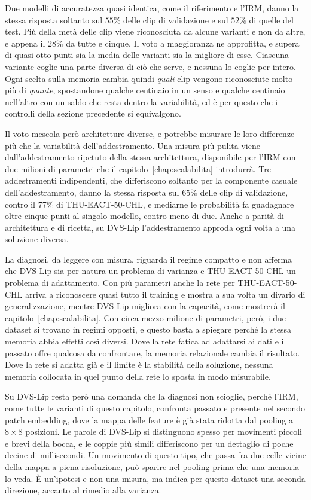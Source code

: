 Due modelli di accuratezza quasi identica, come il riferimento e l'IRM, danno la stessa risposta soltanto sul $55\%$ delle clip di validazione e sul $52\%$ di quelle del test. Più della metà delle clip viene riconosciuta da alcune varianti e non da altre, e appena il $28\%$ da tutte e cinque. Il voto a maggioranza ne approfitta, e supera di quasi otto punti sia la media delle varianti sia la migliore di esse. Ciascuna variante coglie una parte diversa di ciò che serve, e nessuna lo coglie per intero. Ogni scelta sulla memoria cambia quindi \emph{quali} clip vengono riconosciute molto più di \emph{quante}, spostandone qualche centinaio in un senso e qualche centinaio nell'altro con un saldo che resta dentro la variabilità, ed è per questo che i controlli della sezione precedente si equivalgono.

Il voto mescola però architetture diverse, e potrebbe misurare le loro differenze più che la variabilità dell'addestramento. Una misura più pulita viene dall'addestramento ripetuto della stessa architettura, disponibile per l'IRM con due milioni di parametri che il capitolo~\ref{chap:scalabilita} introdurrà. Tre addestramenti indipendenti, che differiscono soltanto per la componente casuale dell'addestramento, danno la stessa risposta sul $65\%$ delle clip di validazione, contro il $77\%$ di THU-EACT-50-CHL, e mediarne le probabilità fa guadagnare oltre cinque punti al singolo modello, contro meno di due. Anche a parità di architettura e di ricetta, su DVS-Lip l'addestramento approda ogni volta a una soluzione diversa.

La diagnosi, da leggere con misura, riguarda il regime compatto e non afferma che DVS-Lip sia per natura un problema di varianza e THU-EACT-50-CHL un problema di adattamento. Con più parametri anche la rete per THU-EACT-50-CHL arriva a riconoscere quasi tutto il training e mostra a sua volta un divario di generalizzazione, mentre DVS-Lip migliora con la capacità, come mostrerà il capitolo~\ref{chap:scalabilita}. Con circa mezzo milione di parametri, però, i due dataset si trovano in regimi opposti, e questo basta a spiegare perché la stessa memoria abbia effetti così diversi. Dove la rete fatica ad adattarsi ai dati e il passato offre qualcosa da confrontare, la memoria relazionale cambia il risultato. Dove la rete si adatta già e il limite è la stabilità della soluzione, nessuna memoria collocata in quel punto della rete lo sposta in modo misurabile.

Su DVS-Lip resta però una domanda che la diagnosi non scioglie, perché l'IRM, come tutte le varianti di questo capitolo, confronta passato e presente nel secondo patch embedding, dove la mappa delle feature è già stata ridotta dal pooling a $8\times8$ posizioni. Le parole di DVS-Lip si distinguono spesso per movimenti piccoli e brevi della bocca, e le coppie più simili differiscono per un dettaglio di poche decine di millisecondi. Un movimento di questo tipo, che passa fra due celle vicine della mappa a piena risoluzione, può sparire nel pooling prima che una memoria lo veda. È un'ipotesi e non una misura, ma indica per questo dataset una seconda direzione, accanto al rimedio alla varianza.

